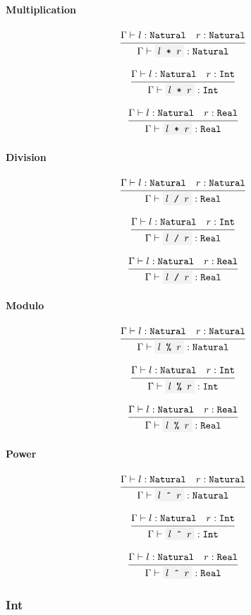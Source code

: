 \documentclass[11pt]{report}
\newcommand{\infrule}[3][gathered]{\frac{\begin{#1}#2\end{#1}}{\begin{gathered}#3\end{gathered}}}
\newcommand{\then}{\vdash}
\newcommand{\code}[1]{\texttt{\colorbox{gray!10}{#1}}}
\newcommand{\Int}{\texttt{Int}}
\newcommand{\Natural}{\texttt{Natural}}
\newcommand{\Real}{\texttt{Real}}
\newcommand{\Env}{\Gamma}
\theoremstyle{definition}
\begin{document}
\paragraph{Multiplication}

\[
	\infrule{
		\Env\then l:\Natural \quad r:\Natural
	}{
		\Env\then \code{$l$ * $r$} : \Natural
	}
\]


\[
	\infrule{
		\Env\then l:\Natural \quad r:\Int
	}{
		\Env\then \code{$l$ * $r$} : \Int
	}
\]

\[
	\infrule{
		\Env\then l:\Natural \quad r:\Real
	}{
		\Env\then \code{$l$ * $r$} : \Real
	}
\]

\paragraph{Division}

\[
	\infrule{
		\Env\then l:\Natural \quad r:\Natural
	}{
		\Env\then \code{$l$ / $r$} : \Real
	}
\]

\[
	\infrule{
		\Env\then l:\Natural \quad r:\Int
	}{
		\Env\then \code{$l$ / $r$} : \Real
	}
\]

\[
	\infrule{
		\Env\then l:\Natural \quad r:\Real
	}{
		\Env\then \code{$l$ / $r$} : \Real
	}
\]

\paragraph{Modulo}

\[
	\infrule{
		\Env\then l:\Natural \quad r:\Natural
	}{
		\Env\then \code{$l$ \% $r$} : \Natural
	}
\]

\[
	\infrule{
		\Env\then l:\Natural \quad r:\Int
	}{
		\Env\then \code{$l$ \% $r$} : \Int
	}
\]

\[
	\infrule{
		\Env\then l:\Natural \quad r:\Real
	}{
		\Env\then \code{$l$ \% $r$} : \Real
	}
\]

\paragraph{Power}

\[
	\infrule{
		\Env\then l:\Natural \quad r:\Natural
	}{
		\Env\then \code{$l$ \^{} $r$} : \Natural
	}
\]

\[
	\infrule{
		\Env\then l:\Natural \quad r:\Int
	}{
		\Env\then \code{$l$ \^{} $r$} : \Int
	}
\]

\[
	\infrule{
		\Env\then l:\Natural \quad r:\Real
	}{
		\Env\then \code{$l$ \^{} $r$} : \Real
	}
\]

\subsubsection{Int}
\end{document}
